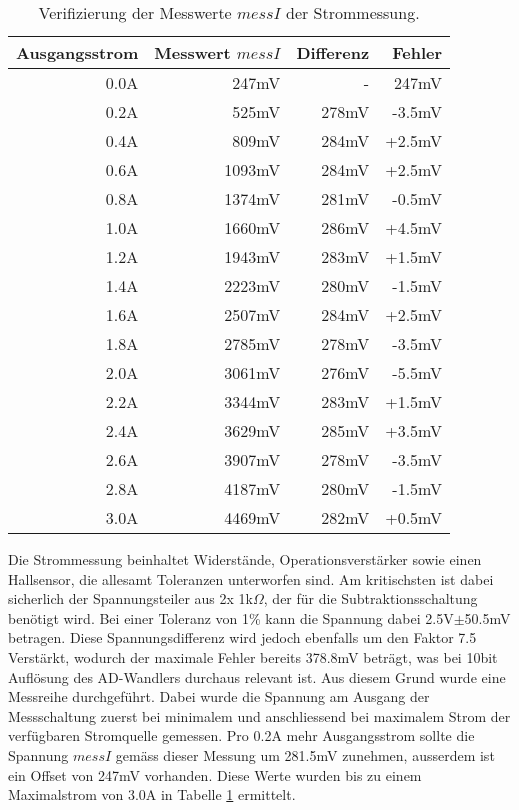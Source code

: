 \begin{table}[h]%
\centering
\begin{tabular}{|r|r|r|r|}
	\hline
	\textbf{Ausgangsstrom} & \textbf{Messwert $messI$} & \textbf{Differenz} & \textbf{Fehler} \\ \hline
	0.0A & 247mV & - & 247mV \\ \hline
	0.2A & 525mV & 278mV & -3.5mV \\ \hline
	0.4A & 809mV & 284mV & +2.5mV \\ \hline
	0.6A & 1093mV & 284mV & +2.5mV \\ \hline
	0.8A & 1374mV & 281mV & -0.5mV \\ \hline
	1.0A & 1660mV & 286mV & +4.5mV \\ \hline
	1.2A & 1943mV & 283mV & +1.5mV \\ \hline
	1.4A & 2223mV & 280mV & -1.5mV \\ \hline
	1.6A & 2507mV & 284mV & +2.5mV \\ \hline
	1.8A & 2785mV & 278mV & -3.5mV \\ \hline
	2.0A & 3061mV & 276mV & -5.5mV \\ \hline
	2.2A & 3344mV & 283mV & +1.5mV \\ \hline
	2.4A & 3629mV & 285mV & +3.5mV \\ \hline
	2.6A & 3907mV & 278mV & -3.5mV \\ \hline
	2.8A & 4187mV & 280mV & -1.5mV \\ \hline
	3.0A & 4469mV & 282mV & +0.5mV \\ \hline
\end{tabular}
\caption{Verifizierung der Messwerte $messI$ der Strommessung.}
\label{tab:messI}
\end{table}

Die Strommessung beinhaltet Widerstände, Operationsverstärker sowie einen Hallsensor, die allesamt Toleranzen unterworfen sind. Am kritischsten ist dabei sicherlich der Spannungsteiler aus 2x 1k$\Omega$, der für die Subtraktionsschaltung benötigt wird. Bei einer Toleranz von 1\% kann die Spannung dabei 2.5V$\pm$50.5mV betragen. Diese Spannungsdifferenz wird jedoch ebenfalls um den Faktor 7.5 Verstärkt, wodurch der maximale Fehler bereits 378.8mV beträgt, was bei 10bit Auflösung des AD-Wandlers durchaus relevant ist. \newline
Aus diesem Grund wurde eine Messreihe durchgeführt. Dabei wurde die Spannung am Ausgang der Messschaltung zuerst bei minimalem und anschliessend bei maximalem Strom der verfügbaren Stromquelle gemessen. Pro 0.2A mehr Ausgangsstrom sollte die Spannung $messI$ gemäss dieser Messung um 281.5mV zunehmen, ausserdem ist ein Offset von 247mV vorhanden. Diese Werte wurden bis zu einem Maximalstrom von 3.0A in Tabelle \ref{tab:messI} ermittelt.

